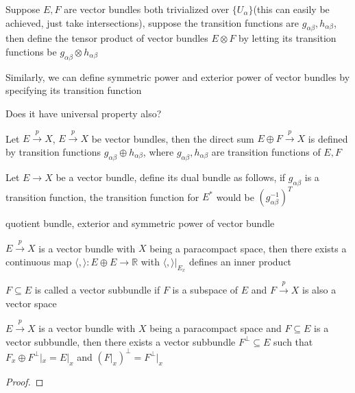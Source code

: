 \documentclass[main]{subfiles}
\begin{document}
\begin{definition}
Suppose $E,F$ are vector bundles both trivialized over $\{U_\alpha\}$(this can easily be achieved, just take intersections), suppose the transition functions are $g_{\alpha\beta},h_{\alpha\beta}$, then define the tensor product of vector bundles $E\otimes F$ by letting its transition functions be $g_{\alpha\beta}\otimes h_{\alpha\beta}$ \par
Similarly, we can define symmetric power and exterior power of vector bundles by specifying its transition function \par
Does it have universal property also?
\end{definition}

\begin{definition}
Let $E\overset{p}{\rightarrow}X$, $E\overset{p}{\rightarrow}X$ be vector bundles, then the direct sum $E\oplus F\overset{p}{\rightarrow}X$ is defined by transition functions $g_{\alpha\beta}\oplus h_{\alpha\beta}$, where $g_{\alpha\beta},h_{\alpha\beta}$ are transition functions of $E,F$
\end{definition}

\begin{definition}
Let $E\to X$ be a vector bundle, define its dual bundle as follows, if $g_{\alpha\beta}$ is a transition function, the transition function for $E^*$ would be $\left(g_{\alpha\beta}^{-1}\right)^{T}$
\end{definition}

\begin{definition}
quotient bundle, exterior and symmetric power of vector bundle
\end{definition}

\begin{proposition}
$E\overset{p}{\rightarrow}X$ is a vector bundle with $X$ being a paracompact space, then there exists a continuous map $\langle,\rangle: E\oplus E\rightarrow\mathbb R$ with $\langle,\rangle|_{E_x}$ defines an inner product
\end{proposition}

\begin{definition}
$F\subseteq E$ is called a vector subbundle  if $F$ is a subspace of $E$ and $F\overset{p}{\rightarrow}X$ is also a vector space
\end{definition}

\begin{proposition}
$E\overset{p}{\rightarrow}X$ is a vector bundle with $X$ being a paracompact space and $F\subseteq E$ is a vector subbundle, then there exists a vector subbundle $F^{\perp}\subseteq E$ such that $F_x\oplus F^{\perp}|_x=E|_x$ and $\left(F|_x\right)^{\perp}=F^{\perp}|_x$ 
\end{proposition}
\begin{proof}
\end{proof}
\end{document}
